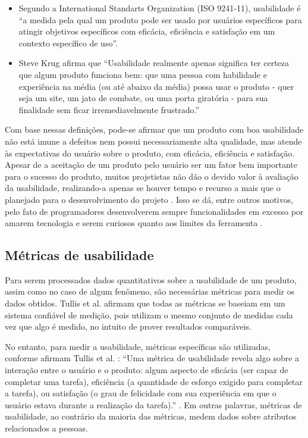 \begin{itemize}
\item  Segundo a International Standarts Organization (ISO 9241-11), usabilidade é ``a medida pela qual um produto pode ser usado por usuários específicos para atingir objetivos específicos com eficácia, eficiência e satisfação em um contexto específico de uso''.
\item  Steve Krug \cite{krug:00} afirma que “Usabilidade realmente apenas significa ter certeza que algum produto funciona bem: que uma pessoa com habilidade e experiência na média (ou até abaixo da média) possa usar o produto - quer seja um site, um jato de combate, ou uma porta giratória - para sua finalidade sem ficar irremediavelmente frustrado.”
\end{itemize}

Com base nessas definições, pode-se afirmar que um produto com boa usabilidade não está imune a defeitos nem possui necessariamente alta qualidade, mas atende às expectativas do usuário sobre o produto, com eficácia, eficiência e satisfação. Apesar de a aceitação de um produto pelo usuário ser um fator bem importante para o sucesso do produto, muitos projetistas não dão o devido valor à avaliação da usabilidade, realizando-a apenas se houver tempo e recurso a mais que o planejado para o desenvolvimento do projeto \cite{anapaula12:MSc}. Isso se dá, entre outros motivos, pelo fato de programadores desenvolverem sempre funcionalidades em excesso por amarem tecnologia e serem curiosos quanto aos limites da ferramenta \cite{barnum:01}.

\subsection{Métricas de usabilidade}
\label{sec:metricas}
	Para serem processados dados quantitativos sobre a usabilidade de um produto, assim como no caso de algum fenômeno, são necessárias métricas para medir os dados obtidos. Tullis et al. \cite{tullis:13} afirmam que todas as métricas se baseiam em um sistema confiável de medição, pois utilizam o mesmo conjunto de medidas cada vez que algo é medido, no intuito de prover resultados comparáveis.

	No entanto, para medir a usabilidade, métricas específicas são utilizadas, conforme afirmam Tullis et al. \cite{tullis:13}: “Uma métrica de usabilidade revela algo sobre a interação entre o usuário e o produto: algum aspecto de eficácia (ser capaz de completar uma tarefa), eficiência (a quantidade de esforço exigido para completar a tarefa), ou satisfação (o grau de felicidade com sua experiência em que o usuário estava durante a realização da tarefa).” .  Em outras palavras, métricas de usabilidade, ao contrário da maioria das métricas, medem dados sobre atributos relacionados a pessoas.

